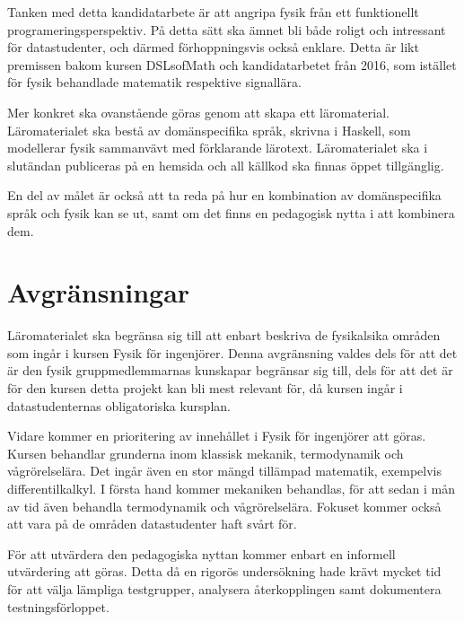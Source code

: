 \begin{draft}

Tanken med detta kandidatarbete är att angripa fysik från ett funktionellt programeringsperspektiv. På detta sätt ska ämnet bli både roligt och intressant för datastudenter, och därmed förhoppningsvis också enklare. Detta är likt premissen bakom kursen DSLsofMath och kandidatarbetet från 2016, som istället för fysik behandlade matematik respektive signallära.

Mer konkret ska ovanstående göras genom att skapa ett läromaterial. Läromaterialet ska bestå av domänspecifika språk, skrivna i Haskell, som modellerar fysik sammanvävt med förklarande lärotext. Läromaterialet ska i slutändan publiceras på en hemsida och all källkod ska finnas öppet tillgänglig.

En del av målet är också att ta reda på hur en kombination av domänspecifika språk och fysik kan se ut, samt om det finns en pedagogisk nytta i att kombinera dem.

\end{draft}

\section{Avgränsningar}

\begin{draft}

Läromaterialet ska begränsa sig till att enbart beskriva de fysikalsika områden som ingår i kursen Fysik för ingenjörer. Denna avgränsning valdes dels för att det är den fysik gruppmedlemmarnas kunskapar begränsar sig till, dels för att det är för den kursen detta projekt kan bli mest relevant för, då kursen ingår i datastudenternas obligatoriska kursplan.

Vidare kommer en prioritering av innehållet i Fysik för ingenjörer att göras. Kursen behandlar grunderna inom klassisk mekanik, termodynamik och vågrörelselära. Det ingår även en stor mängd tillämpad matematik, exempelvis differentilkalkyl. I första hand kommer mekaniken behandlas, för att sedan i mån av tid även behandla termodynamik och vågrörelselära. Fokuset kommer också att vara på de områden datastudenter haft svårt för.

För att utvärdera den pedagogiska nyttan kommer enbart en informell utvärdering att göras. Detta då en rigorös undersökning hade krävt mycket tid för att välja lämpliga testgrupper, analysera återkopplingen samt dokumentera testningsförloppet.

\end{draft}
